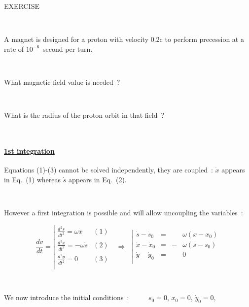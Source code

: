 \documentclass[12pt]{paper}
\newcommand{\nin}{\noindent}
\newcommand{\blue}{\color{blue}}
\begin{document}
\clearpage 

{\centering

\Large 


{\blue 

EXERCISE    \label{EX8}

~


A magnet is designed for a proton with velocity 0.2c to perform precession at a rate of $10^{-6}$~second per turn. 

~

What magnetic field value is needed~?  

~

What is  the radius of the proton orbit in that field~?


~

}


}



\clearpage 


\paragraph{\underline{1st integration}}

Equations (1)-(3) cannot be solved independently, they are coupled~: $\dot x$ appears in Eq.~(1) 
whereas $\dot s$ appears in Eq.~(2).

~

{\blue However a first integration is possible and will allow uncoupling the variables~: }


$$
\frac{\textstyle{dv}}{\textstyle{dt}} = 
\left| 
\begin{array}{lr} 
\frac{\textstyle{d^2s}}{\textstyle{dt^2}} = \omega \dot x     & (1)\\
\frac{\textstyle{d^2x}}{\textstyle{dt^2}} = - \omega \dot s    & (2)\\
\frac{\textstyle{d^2y}}{\textstyle{dt^2}} = 0             & (3)\\
\end{array} 
\right.
~ ~ ~ \Rightarrow ~ ~ ~ 
\left| 
\begin{array}{lcrccl} 
 \dot s - \dot s_0 &=&  & \omega (x - x_0)   \\
 \dot x - \dot x_0 &=& -& \omega (s - s_0)  \\
 \dot y - \dot y_0 &=&  & 0 \\
\end{array} 
\right.$$

~

\nin We now introduce the initial conditions~:  ~ ~ ~ $s_0 = 0$, $x_0 = 0$, $\dot y_0 = 0$, \hfill ~
\end{document}
